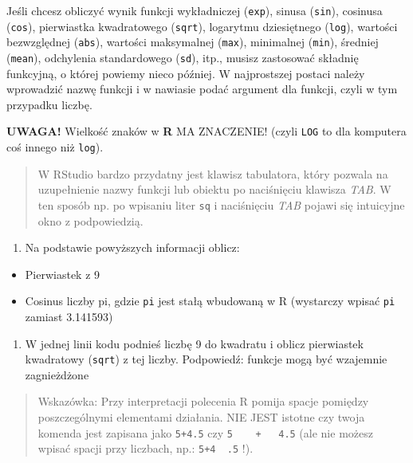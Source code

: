 \documentclass[]{book}
\providecommand{\tightlist}{%
  \setlength{\itemsep}{0pt}\setlength{\parskip}{0pt}}
\theoremstyle{definition}
\theoremstyle{definition}
\theoremstyle{definition}
\theoremstyle{remark}
\begin{document}
Jeśli chcesz obliczyć wynik funkcji wykładniczej (\texttt{exp}), sinusa
(\texttt{sin}), cosinusa (\texttt{cos}), pierwiastka kwadratowego
(\texttt{sqrt}), logarytmu dziesiętnego (\texttt{log}), wartości
bezwzględnej (\texttt{abs}), wartości maksymalnej (\texttt{max}),
minimalnej (\texttt{min}), średniej (\texttt{mean}), odchylenia
standardowego (\texttt{sd}), itp., musisz zastosować składnię funkcyjną,
o której powiemy nieco później. W najprostszej postaci należy wprowadzić
nazwę funkcji i w nawiasie podać argument dla funkcji, czyli w tym
przypadku liczbę.

\textbf{UWAGA!} Wielkość znaków w \textbf{R} MA ZNACZENIE! (czyli
\texttt{LOG} to dla komputera coś innego niż \texttt{log}).

\begin{quote}
W RStudio bardzo przydatny jest klawisz tabulatora, który pozwala na
uzupełnienie nazwy funkcji lub obiektu po naciśnięciu klawisza
\emph{TAB}. W ten sposób np. po wpisaniu liter \texttt{sq} i naciśnięciu
\emph{TAB} pojawi się intuicyjne okno z podpowiedzią.
\end{quote}

\begin{enumerate}
\def\labelenumi{\arabic{enumi}.}
\setcounter{enumi}{6}
\tightlist
\item
  Na podstawie powyższych informacji oblicz:
\end{enumerate}

\begin{itemize}
\tightlist
\item
  Pierwiastek z 9
\item
  Cosinus liczby pi, gdzie \texttt{pi} jest stałą wbudowaną w R
  (wystarczy wpisać \texttt{pi} zamiast 3.141593)
\end{itemize}

\begin{enumerate}
\def\labelenumi{\arabic{enumi}.}
\setcounter{enumi}{7}
\tightlist
\item
  W jednej linii kodu podnieś liczbę 9 do kwadratu i oblicz pierwiastek
  kwadratowy (\texttt{sqrt}) z tej liczby. Podpowiedź: funkcje mogą być
  wzajemnie zagnieżdżone
\end{enumerate}

\begin{quote}
Wskazówka: Przy interpretacji polecenia R pomija spacje pomiędzy
poszczególnymi elementami działania. NIE JEST istotne czy twoja komenda
jest zapisana jako \texttt{5+4.5} czy \texttt{5\ \ \ \ +\ \ \ 4.5} (ale
nie możesz wpisać spacji przy liczbach, np.: \texttt{5+4\ \ .5} !).
\end{quote}
\end{document}
